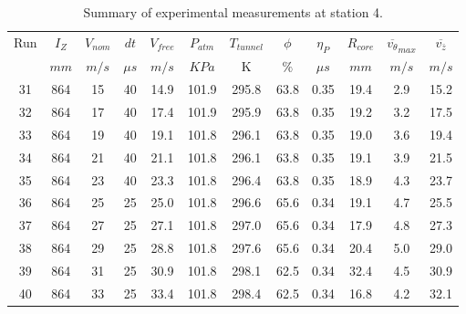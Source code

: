 \begin{table}[H]
\begin{center}
\begin{tabular}{|cccccccccccc|}
	\hline
	Run & $I_Z$ & $V_{nom}$ & $dt$ & $V_{free}$ & $P_{atm}$ & $T_{tunnel}$ & $\phi$ & $\eta_P$ & $R_{core}$ & $\overline{v_{\theta}}_{max}$ & $\overline{v_{\bar{z}}}$\\
	  & $mm$ & $m/s$ & $\mu s$ & $m/s$ & $KPa$ & K & $\%$ & $\mu s$ & $mm$ & $m/s$ & $m/s$\\
	\hline
	31 & 864 & 15 & 40 & 14.9 & 101.9 & 295.8 & 63.8 & 0.35 & 19.4 & 2.9 & 15.2\\
	32 & 864 & 17 & 40 & 17.4 & 101.9 & 295.9 & 63.8 & 0.35 & 19.2 & 3.2 & 17.5\\
	33 & 864 & 19 & 40 & 19.1 & 101.8 & 296.1 & 63.8 & 0.35 & 19.0 & 3.6 & 19.4\\
	34 & 864 & 21 & 40 & 21.1 & 101.8 & 296.1 & 63.8 & 0.35 & 19.1 & 3.9 & 21.5\\
	35 & 864 & 23 & 40 & 23.3 & 101.8 & 296.4 & 63.8 & 0.35 & 18.9 & 4.3 & 23.7\\
	36 & 864 & 25 & 25 & 25.0 & 101.8 & 296.6 & 65.6 & 0.34 & 19.1 & 4.7 & 25.5\\
	37 & 864 & 27 & 25 & 27.1 & 101.8 & 297.0 & 65.6 & 0.34 & 17.9 & 4.8 & 27.3\\
	38 & 864 & 29 & 25 & 28.8 & 101.8 & 297.6 & 65.6 & 0.34 & 20.4 & 5.0 & 29.0\\
	39 & 864 & 31 & 25 & 30.9 & 101.8 & 298.1 & 62.5 & 0.34 & 32.4 & 4.5 & 30.9\\
	40 & 864 & 33 & 25 & 33.4 & 101.8 & 298.4 & 62.5 & 0.34 & 16.8 & 4.2 & 32.1\\
	\hline
\end{tabular}
\caption{Summary of experimental measurements at station 4.}
\label{table:experiment_results_4}
\end{center}
\end{table}
